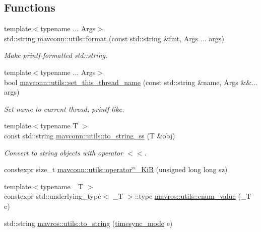\subsection*{Functions}
\begin{DoxyCompactItemize}
\item 
{\footnotesize template$<$typename ... Args$>$ }\\std\+::string \mbox{\hyperlink{group__mavutils_ga0d03da68919138512c198995276dd9ea}{mavconn\+::utils\+::format}} (const std\+::string \&fmt, Args ... args)
\begin{DoxyCompactList}\small\item\em Make printf-\/formatted std\+::string. \end{DoxyCompactList}\item 
{\footnotesize template$<$typename ... Args$>$ }\\bool \mbox{\hyperlink{group__mavutils_gac5ea11f12ae2183df1dc4a810ff0a87b}{mavconn\+::utils\+::set\+\_\+this\+\_\+thread\+\_\+name}} (const std\+::string \&name, Args \&\&... args)
\begin{DoxyCompactList}\small\item\em Set name to current thread, printf-\/like. \end{DoxyCompactList}\item 
{\footnotesize template$<$typename T $>$ }\\const std\+::string \mbox{\hyperlink{group__mavutils_ga6c132876dd85249684a7935fe0bc8f51}{mavconn\+::utils\+::to\+\_\+string\+\_\+ss}} (T \&obj)
\begin{DoxyCompactList}\small\item\em Convert to string objects with operator $<$$<$. \end{DoxyCompactList}\item 
constexpr size\+\_\+t \mbox{\hyperlink{group__mavutils_ga301ff0ee568776aa543ccaff3c1c039c}{mavconn\+::utils\+::operator\char`\"{}\char`\"{}\+\_\+\+KiB}} (unsigned long long sz)
\item 
{\footnotesize template$<$typename \+\_\+T $>$ }\\constexpr std\+::underlying\+\_\+type$<$ \+\_\+T $>$\+::type \mbox{\hyperlink{group__mavutils_gaed9174e090ae0f75aeb9096b7cb6be56}{mavros\+::utils\+::enum\+\_\+value}} (\+\_\+T e)
\item 
std\+::string \mbox{\hyperlink{group__mavutils_gac86aed43baa119369cb7eb523c7de067}{mavros\+::utils\+::to\+\_\+string}} (\mbox{\hyperlink{group__mavutils_gac7f53712a7627f397d0eb145c2a16cf7}{timesync\+\_\+mode}} e)

\end{DoxyCompactItemize}
